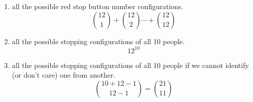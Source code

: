 \documentclass[12pt]{article}%
\newcommand{\0}{{\bf 0}}
\begin{document}
\begin{enumerate}
\begin{enumerate}
\item all the possible red stop button number configurations.
\\
{\color{blue}{\bf Sol.}}
$${12 \choose 1}+{12 \choose 2} \cdots + {12 \choose 12} $$
\item all the possible stopping configurations of all 10 people.
\\
{\color{blue}{\bf Sol.}}
$$12^10$$
\item all the possible stopping configurations of all 10 people {\color{red}if we cannot identify (or don't care) one from another.}
\\
{\color{blue}{\bf Sol.}}
$$ {10+12-1\choose 12-1}={21\choose 11} $$
\end{enumerate}

\end{enumerate}
\end{document}
